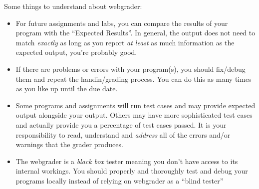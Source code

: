\documentclass[12pt]{scrartcl}
\begin{document}
Some things to understand about webgrader:
\begin{itemize}
  \item For future assignments and labs, you can compare the results of 
  	your program with the ``Expected Results''.  In general, the output
	does not need to match \emph{exactly} as long as you report \emph{at least}
	as much information as the expected output, you're probably good.
  \item If there are problems or errors with your program(s), 
    you should fix/debug them and repeat the handin/grading process.
	You can do this as many times as you like up until the due date.  
  \item Some programs 
	and assignments will run test cases and may provide expected output alongside 
	your output.  Others may have more sophisticated test cases and actually provide 
	you a percentage of test cases passed.  It is your responsibility to read, 
	understand and \emph{address} all of the errors and/or warnings that the grader produces.
  \item The webgrader is a \emph{black box} tester meaning you don't have
  access to its internal workings.  You should properly and thoroughly test
  and debug your programs locally instead of relying on webgrader as a 
  ``blind tester''
\end{itemize}
\end{document}
